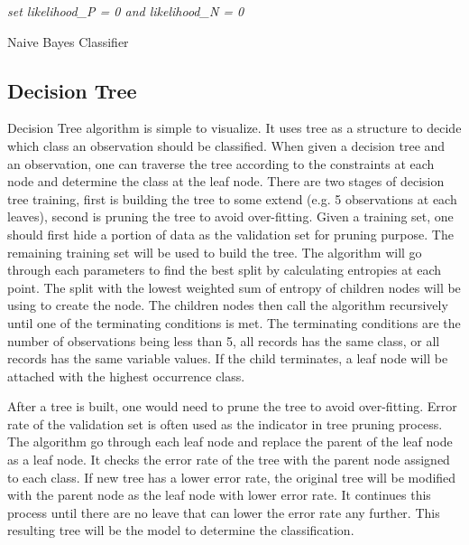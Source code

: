 \documentclass[twoside]{article}
\begin{document}
\IncMargin{1em}
\begin{algorithm}
\BlankLine
\emph{set likelihood\_P = 0 and likelihood\_N = 0}\;
\caption{Naive Bayes Classifier}\label{NBC}
\end{algorithm}\DecMargin{1em}


\subsection{Decision Tree}
Decision Tree algorithm is simple to visualize. It uses tree as a structure to decide which class an observation should be classified. When given a decision tree and an observation, one can traverse the tree according to the constraints at each node and determine the class at the leaf node. There are two stages of decision tree training, first is building the tree to some extend (e.g. 5 observations at each leaves), second is pruning the tree to avoid over-fitting. Given a training set, one should first hide a portion of data as the validation set for pruning purpose. The remaining training set will be used to build the tree. The algorithm will go through each parameters to find the best split by calculating entropies at each point. The split with the lowest weighted sum of entropy of children nodes will be using to create the node. The children nodes then call the algorithm recursively until one of the terminating conditions is met. The terminating conditions are the number of observations being less than 5, all records has the same class, or all records has the same variable values. If the child terminates, a leaf node will be attached with the highest occurrence class.

After a tree is built, one would need to prune the tree to avoid over-fitting. Error rate of the validation set is often used as the indicator in tree pruning process. The algorithm go through each leaf node and replace the parent of the leaf node as a leaf node. It checks the error rate of the tree with the parent node assigned to each class. If new tree has a lower error rate, the original tree will be modified with the parent node as the leaf node with lower error rate. It continues this process until there are no leave that can lower the error rate any further. This resulting tree will be the model to determine the classification. 
\end{document}
